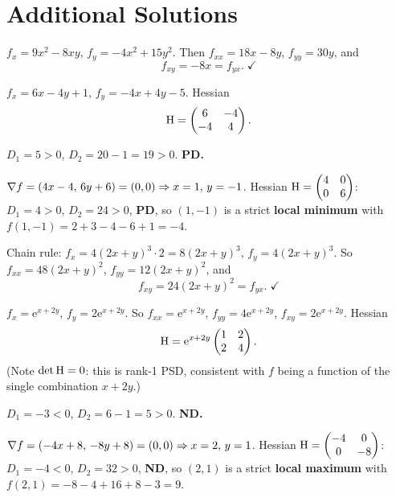 \section{Additional Solutions}

\begin{solutions}
  \item $f_x = 9x^{2} - 8xy$, $f_y = -4x^{2} + 15y^{2}$. Then
        $f_{xx} = 18x - 8y$, $f_{yy} = 30y$, and
        \[
          f_{xy} = -8x = f_{yx} . \; \checkmark
        \]

  \item $f_x = 6x - 4y + 1$, $f_y = -4x + 4y - 5$. Hessian
        \[
          \operatorname{H} = \begin{pmatrix}6&-4\\-4&4\end{pmatrix} .
        \]

  \item $D_1 = 5 > 0$, $D_2 = 20 - 1 = 19 > 0$. \textbf{PD.}

  \item $\nabla f = (4x-4,\,6y+6) = (0,0) \Rightarrow x=1,\,y=-1$. Hessian
        $\operatorname{H} = \begin{pmatrix}4&0\\0&6\end{pmatrix}$: $D_1=4>0$,
        $D_2=24>0$, \textbf{PD}, so $(1,-1)$ is a strict \textbf{local
        minimum} with $f(1,-1) = 2+3-4-6+1 = -4$.

  \item Chain rule: $f_x = 4(2x+y)^{3}\cdot2 = 8(2x+y)^{3}$,
        $f_y = 4(2x+y)^{3}$. So $f_{xx} = 48(2x+y)^{2}$,
        $f_{yy} = 12(2x+y)^{2}$, and
        \[
          f_{xy} = 24(2x+y)^{2} = f_{yx} . \; \checkmark
        \]

  \item $f_x = \mathrm{e}^{x+2y}$, $f_y = 2\mathrm{e}^{x+2y}$. So
        $f_{xx} = \mathrm{e}^{x+2y}$, $f_{yy} = 4\mathrm{e}^{x+2y}$,
        $f_{xy} = 2\mathrm{e}^{x+2y}$. Hessian
        \[
          \operatorname{H} = \mathrm{e}^{x+2y}\begin{pmatrix}1&2\\2&4\end{pmatrix} .
        \]
        (Note $\det\operatorname{H} = 0$: this is rank-1 PSD, consistent with $f$
        being a function of the single combination $x+2y$.)

  \item $D_1 = -3 < 0$, $D_2 = 6 - 1 = 5 > 0$. \textbf{ND.}

  \item $\nabla f = (-4x+8,\,-8y+8) = (0,0) \Rightarrow x=2,\,y=1$. Hessian
        $\operatorname{H} = \begin{pmatrix}-4&0\\0&-8\end{pmatrix}$: $D_1=-4<0$,
        $D_2=32>0$, \textbf{ND}, so $(2,1)$ is a strict \textbf{local
        maximum} with $f(2,1) = -8-4+16+8-3 = 9$.


\end{solutions}
